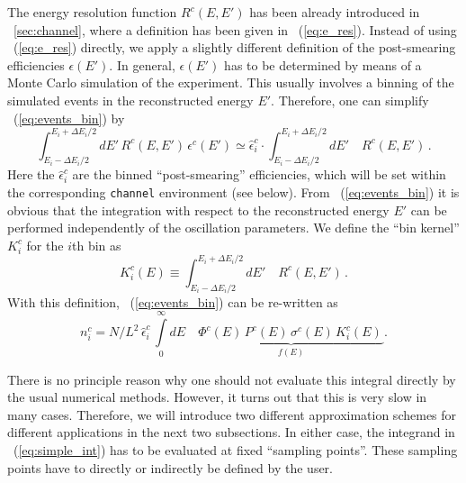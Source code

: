 The energy resolution function $R^c(E,E')$ has been already introduced in 
\Sec~\ref{sec:channel}, where a definition
has been given in \eq~(\ref{eq:e_res}). Instead of using
 \eq~(\ref{eq:e_res}) directly, we apply a slightly different
definition of the post-smearing efficiencies $\epsilon(E')$. 
In general, $\epsilon(E')$ has to be
determined by means of a Monte Carlo simulation of the experiment. 
This usually involves a binning of the simulated events in the 
reconstructed energy $E'$. Therefore, one can simplify \eq~(\ref{eq:events_bin}) by
\begin{equation}
\label{eq:post_smearing}
\int_{E_i-\Delta E_i/2}^{E_i+\Delta E_i/2} dE' \, R^c(E,E') \, \epsilon^c(E')
 \simeq \hat\epsilon_i^c \cdot \int_{E_i-\Delta E_i/2}^{E_i+\Delta E_i/2} dE' 
\quad R^c(E,E')\,.
\end{equation}
Here the  $\hat\epsilon_i^c$ are the 
binned ``post-smearing'' efficiencies, which will be set within the corresponding {\tt channel} environment (see below).
From \eq~(\ref{eq:events_bin}) it is obvious that the integration with respect to the reconstructed energy $E'$ can be
performed independently of the oscillation parameters. We define
the ``bin kernel'' $K_i^c$ for the $i$th bin as
\begin{equation}
\label{eq:kernel}
K_i^c(E) \equiv \int_{E_i-\Delta E_i/2}^{E_i+\Delta E_i/2} dE' 
\quad R^c(E,E')\,.
\end{equation}
With this definition, \eq~(\ref{eq:events_bin}) can be re-written as
\begin{equation}
\label{eq:simple_int}
n_i^c=N/L^2 \,
\hat\epsilon_i^c \, \int\limits_0^\infty dE\quad  \underbrace{\Phi^c(E)\,
P^c(E)\,
\sigma^c(E) \, K_i^c(E)\,}_{f(E)}. 
\end{equation}

There is no principle reason why one should not evaluate this integral directly by the usual numerical methods. However, it turns out that this 
is very slow in many cases. Therefore, we will introduce two different approximation schemes for different applications in the next two subsections.
In either case, the integrand in \eq~(\ref{eq:simple_int}) has to be evaluated at fixed ``sampling points''. These sampling points have to directly 
or indirectly be defined by the user.

